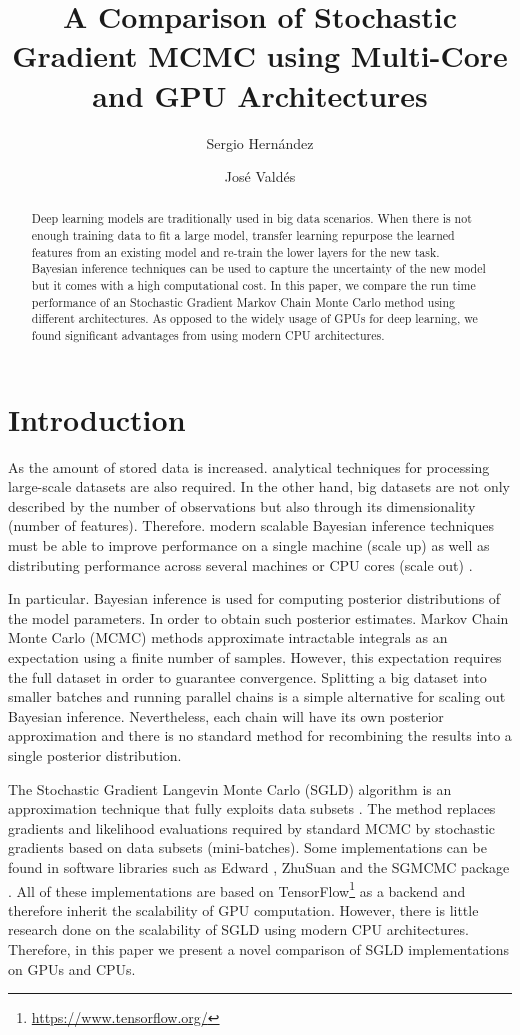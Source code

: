 \documentclass[9pt,lineno]{crone}
\title{A Comparison of Stochastic Gradient MCMC using Multi-Core and GPU Architectures}
\author[1*]{Sergio Hern\'andez}
\author[1]{Jos\'e Vald\'es}
\affil[1]{Laboratorio de Procesamiento de Informaci\'on Geoespacial. Universidad Cat\'olica del Maule. Chile}
\affil[2]{Centro de Innovaci\'on en Ingenier\'ia Aplicada.}
\begin{document}
\maketitle

\begin{abstract}
Deep learning models are traditionally used in big data scenarios. When there is not enough training data to fit a large model, transfer learning repurpose the learned features from an existing model and re-train the lower layers for the new task. Bayesian inference techniques can be used to capture the uncertainty of the new model but it comes with a high computational cost. In this paper, we compare the run time performance of an Stochastic Gradient Markov Chain Monte Carlo method using different architectures. As opposed to the widely usage of GPUs for deep learning, we found significant advantages from using modern CPU architectures.
\end{abstract}

\section{Introduction}
As the amount of stored data is increased. analytical techniques for processing large-scale datasets are also required. In the other hand, big datasets are not only described by the number of observations but also through its dimensionality (number of features). Therefore. modern scalable Bayesian inference techniques must be able to improve performance on a single machine (scale up) as well as distributing performance across several machines or CPU cores (scale out) \cite{angelino2016patterns}.

In particular. Bayesian inference is used for computing posterior distributions of the model parameters. In order to obtain such posterior estimates. Markov Chain Monte Carlo (MCMC) methods approximate intractable integrals as an expectation using a finite number of samples. However, this expectation requires the full dataset in order to guarantee convergence.  Splitting a big dataset into smaller batches and running parallel chains is a simple alternative for scaling out Bayesian inference. Nevertheless, each chain will have its own posterior approximation and there is no standard method for recombining the results into a single posterior distribution. 

The Stochastic Gradient Langevin Monte Carlo (SGLD) algorithm is an approximation technique that fully exploits data subsets \cite{welling2011bayesian}. The method replaces gradients and likelihood evaluations required by standard MCMC by stochastic gradients based on data subsets (mini-batches). Some implementations can be found in software libraries such as Edward \cite{Tran2018}, ZhuSuan \cite{zhusuan2017} and the SGMCMC package \cite{baker2017sgmcmc}. All of these implementations are based on TensorFlow\footnote{\url{https://www.tensorflow.org/}} as a backend and therefore inherit the scalability of GPU computation. However, there is little research done on the scalability of SGLD using modern CPU architectures. Therefore, in this paper we present a novel comparison of SGLD implementations on GPUs and CPUs. 
% 
\end{document}
